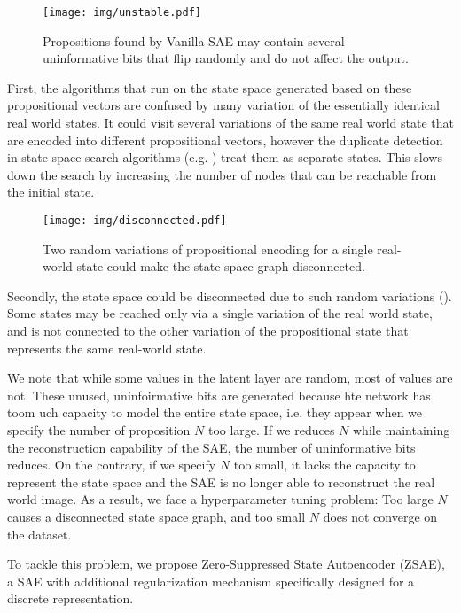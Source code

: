 \begin{figure}[htb]
 \centering
 \texttt{[image: img/unstable.pdf]}
 \caption{Propositions found by Vanilla SAE may contain several uninformative bits
 that flip randomly and do not affect the output.}
 \label{unstable}
\end{figure}

First, the algorithms that run on the state space generated based on these propositional vectors
are confused by many variation of the essentially identical real world states.
It could visit several variations of the same real world state that are encoded into different propositional vectors,
however the duplicate detection in state space search algorithms (e.g. \astar) treat them as separate states.
This slows down the search by increasing the number of nodes that can be reachable from the initial state.

\begin{figure}[htb]
 \centering
 \texttt{[image: img/disconnected.pdf]}
 \caption{Two random variations of propositional encoding for a single real-world state could make the state space graph disconnected.}
 \label{disconnected}
\end{figure}

Secondly, the state space could be disconnected due to such random variations ().
Some states may be reached only via a single variation of the real world state, and is not connected to the
other variation of the propositional state that represents the same real-world state.

We note that while some values in the latent layer are random, most of values are not.
These unused, uninfoirmative bits are generated because hte network has toom uch capacity to 
model the entire state space, i.e. they appear when we specify the number of proposition $N$ too large.
If we reduces $N$ while maintaining the reconstruction capability of the SAE, the number of uninformative bits
reduces.
On the contrary, if we specify $N$ too small, it lacks the capacity to represent the state space
and the SAE is no longer able to reconstruct the
real world image.
As a result, we face a hyperparameter tuning problem: Too large $N$ causes a disconnected state space graph,
and too small $N$ does not converge on the dataset.

To tackle this problem, we propose Zero-Suppressed State Autoencoder (ZSAE),
a SAE with additional regularization mechanism specifically designed for a discrete representation.

